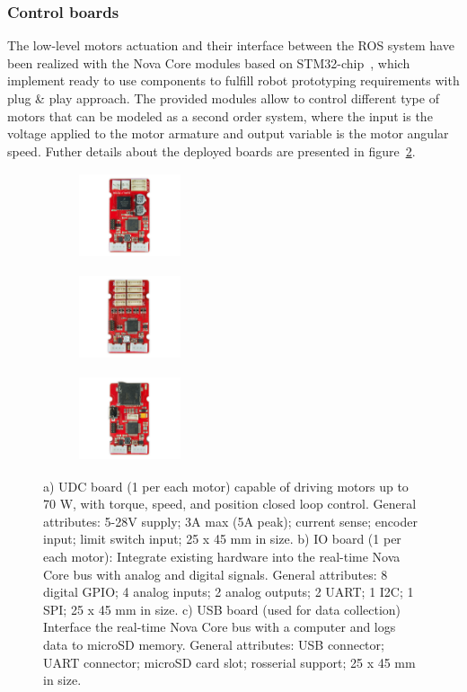 \subsubsection{Control boards}
\label{novacore}
The low-level motors actuation and their interface between the ROS system have been realized with the Nova Core modules based on STM32-chip~\cite{noauthor_nova_nodate}, which implement ready to use components to fulfill robot prototyping requirements with plug \& play approach.  
The provided modules allow to control different type of motors that can be modeled as a second order system, where the input is the voltage applied to the motor armature and output variable is the motor angular speed. Futher details about the deployed boards are presented in figure~\ref{fig:boards}.

\begin{figure}[ht]
  \centering
  \begin{subfigure}[b]{0.3\textwidth}
  \centering
      \includegraphics[width=3cm,height=2.5cm]{images/03-foundation/udc}
	\caption{}
  \end{subfigure}
  \begin{subfigure}[b]{0.3\textwidth}
  \centering
      \includegraphics[width=3cm,height=2.5cm]{images/03-foundation/io}
	\caption{}
  \end{subfigure}
  \begin{subfigure}[b]{0.3\textwidth}
  \centering
      \includegraphics[width=3cm,height=2.5cm]{images/03-foundation/usb}
	\caption{}
	\label{fig:usb_board}
  \end{subfigure}
  \caption{a) UDC board (1 per each motor) capable of driving motors up to 70 W, with torque, speed, and position closed loop control. General attributes: 5-28V supply; 3A max (5A peak); current sense; encoder input; limit switch input; 25 x 45 mm in size. b) IO board (1 per each motor): Integrate existing hardware into the real-time Nova Core bus with analog and digital signals. General attributes: 8 digital GPIO;  4 analog inputs; 2 analog outputs; 2 UART; 1 I2C; 1 SPI; 25 x 45 mm in size. c) USB board (used for data collection) Interface the real-time Nova Core bus with a computer and logs data to microSD memory. General attributes: USB connector;  UART connector; microSD card slot; rosserial support; 25 x 45 mm in size.}
  \label{fig:boards}
\end{figure}
